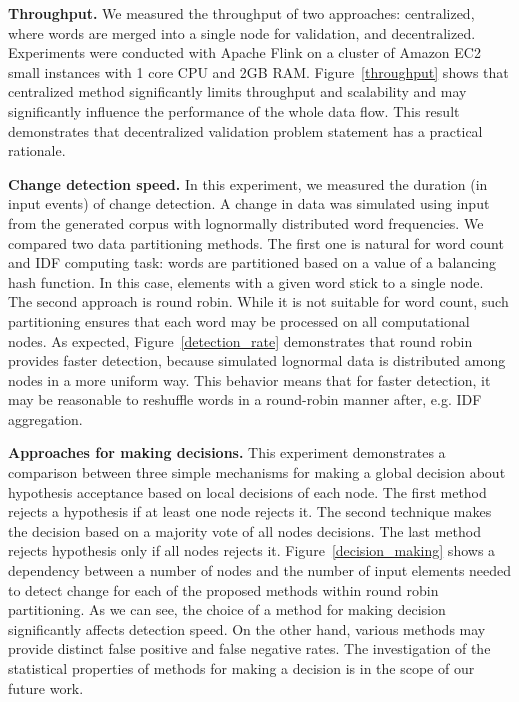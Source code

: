 {\bf Throughput.} We measured the throughput of two approaches: centralized, where words are merged into a single node for validation, and decentralized. Experiments were conducted with Apache Flink on a cluster of Amazon EC2 small instances with 1 core CPU and 2GB RAM. Figure~\ref{throughput} shows that centralized method significantly limits throughput and scalability and may significantly influence the performance of the whole data flow. This result demonstrates that decentralized validation problem statement has a practical rationale.

{\bf Change detection speed.} In this experiment, we measured the duration (in input events) of change detection. A change in data was simulated using input from the generated corpus with lognormally distributed word frequencies. We compared two data partitioning methods. The first one is natural for word count and IDF computing task: words are partitioned based on a value of a balancing hash function. In this case, elements with a given word stick to a single node. The second approach is round robin. While it is not suitable for word count, such partitioning ensures that each word may be processed on all computational nodes. As expected, Figure~\ref{detection_rate} demonstrates that round robin provides faster detection, because simulated lognormal data is distributed among nodes in a more uniform way. This behavior means that for faster detection, it may be reasonable to reshuffle words in a round-robin manner after, e.g. IDF aggregation.

{\bf Approaches for making decisions.} This experiment demonstrates a comparison between three simple mechanisms for making a global decision about hypothesis acceptance based on local decisions of each node. The first method rejects a hypothesis if at least one node rejects it. The second technique makes the decision based on a majority vote of all nodes decisions. The last method rejects hypothesis only if all nodes rejects it. Figure~\ref{decision_making} shows a dependency between a number of nodes and the number of input elements needed to detect change for each of the proposed methods within round robin partitioning. As we can see, the choice of a method for making decision significantly affects detection speed. On the other hand, various methods may provide distinct false positive and false negative rates. The investigation of the statistical properties of methods for making a decision is in the scope of our future work.